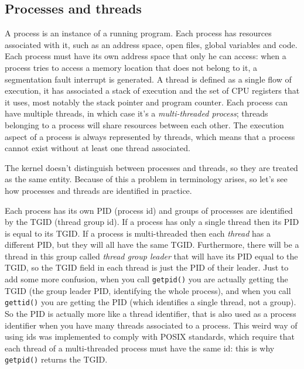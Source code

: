 \documentclass[10pt]{book}
\begin{document}
\subsection{Processes and threads} A process is an instance of a running program. Each process has resources associated with it, such as an address space, open files, global variables and code. Each process must have its own address space that only he can access: when a process tries to access a memory location that does not belong to it, a segmentation fault interrupt is generated. A thread is defined as a single flow of execution, it has associated a stack of execution and the set of CPU registers that it uses, most notably the stack pointer and program counter. Each process can have multiple threads, in which case it's a \textit{multi-threaded process}; threads belonging to a process will share resources between each other. The execution aspect of a process is always represented by threads, which means that a process cannot exist without at least one thread associated.

The kernel doesn't distinguish between processes and threads, so they are treated as the same entity. Because of this a problem in terminology arises, so let's see how processes and threads are identified in practice.

Each process has its own PID (process id) and groups of processes are identified by the TGID (thread group id). If a process has only a single thread then its PID is equal to its TGID. If a process is multi-threaded then each \textit{thread} has a different PID, but they will all have the same TGID. Furthermore, there will be a thread in this group called \textit{thread group leader} that will have its PID equal to the TGID, so the TGID field in each thread is just the PID of their leader. Just to add some more confusion, when you call \verb|getpid()| you are actually getting the TGID (the group leader PID, identifying the whole process), and when you call \verb|gettid()| you are getting the PID (which identifies a single thread, not a group). So the PID is actually more like a thread identifier, that is also used as a process identifier when you have many threads associated to a process. This weird way of using ids was implemented to comply with POSIX standards, which require that each thread of a multi-threaded process must have the same id: this is why \verb|getpid()| returns the TGID.
\end{document}
